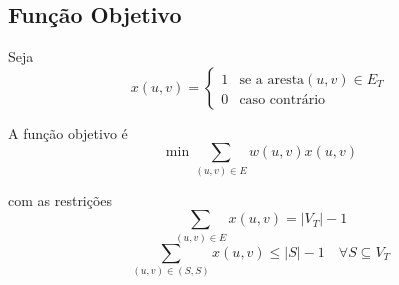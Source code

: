 \documentclass[a4paper,12pt,titlepage]{article}
\begin{document}
\subsection*{Função Objetivo}
Seja $$x(u,v) = \begin{cases}
1 & \text{se a aresta} (u,v) \in E_T\\
0 & \text{caso contrário} 
\end{cases}$$

A função objetivo é
$$\min \sum_{(u,v)\in E} w(u,v)x(u,v)$$

com as restrições 
$$\sum_{(u,v)\in E} x(u,v) = |V_T| - 1$$
$$\sum_{(u,v)\in (S,S)} x(u,v) \leq |S| - 1 \quad \forall S \subseteq V_T$$
\end{document}
